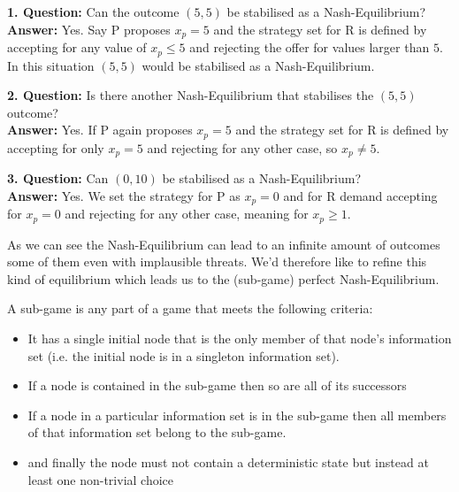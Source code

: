 \begin{example}
	
	\textbf{1. Question:} Can the outcome $(5, 5)$ be stabilised as a Nash-Equilibrium? \\
	\textbf{Answer:} Yes. Say P proposes $x_{p} = 5$ and the strategy set for R is defined by accepting for any value of $x_{p} \leq 5$ and rejecting the offer for values larger than $5$. \\
		In this situation $(5, 5)$ would be stabilised as a Nash-Equilibrium.


	\textbf{2. Question:} Is there another Nash-Equilibrium that stabilises the $(5, 5)$ outcome? \\
	\textbf{Answer:} Yes. If P again proposes $x_{p} = 5$ and the strategy set for R is defined by accepting for only $x_{p} = 5$ and rejecting for any other case, so $x_{p} \neq 5$. 
	
	
	\textbf{3. Question:} Can $(0, 10)$ be stabilised as a Nash-Equilibrium? \\
	\textbf{Answer:} Yes. We set the strategy for P as $x_{p} = 0$ and for R demand accepting for $x_{p} = 0$ and rejecting for any other case, meaning for $x_{p} \geq 1$. 
\end{example}

As we can see the Nash-Equilibrium can lead to an infinite amount of outcomes some of them even with implausible threats. We'd therefore like to refine this kind of equilibrium which leads us to the (sub-game) perfect Nash-Equilibrium.

\begin{definition} 
	A sub-game is any part of a game that meets the following criteria:
	\begin{itemize}
		\item It has a single initial node that is the only member of that node's information set (i.e. the initial node is in a singleton information set).
		\item If a node is contained in the sub-game then so are all of its successors
		\item If a node in a particular information set is in the sub-game then all members of that information set belong to the sub-game.
		\item and finally the node must not contain a deterministic state but instead at least one non-trivial choice
	\end{itemize}
\end{definition}

